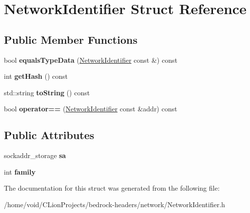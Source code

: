 \hypertarget{struct_network_identifier}{}\section{Network\+Identifier Struct Reference}
\label{struct_network_identifier}
\subsection*{Public Member Functions}
\begin{DoxyCompactItemize}
\item 
\mbox{\label{struct_network_identifier_a64e2ed23f69e08ecfeedb79d16879f16}} 
bool {\bfseries equals\+Type\+Data} (\mbox{\hyperlink{struct_network_identifier}{Network\+Identifier}} const \&) const
\item 
\mbox{\label{struct_network_identifier_a6f70af24d1ac5b1b70d19d95b85643b2}} 
int {\bfseries get\+Hash} () const
\item 
\mbox{\label{struct_network_identifier_affd13c90fab6334bc7b6d46d0ee88490}} 
std\+::string {\bfseries to\+String} () const
\item 
\mbox{\label{struct_network_identifier_a58e6203460b78d32a82b6b49ab0c15e1}} 
bool {\bfseries operator==} (\mbox{\hyperlink{struct_network_identifier}{Network\+Identifier}} const \&addr) const
\end{DoxyCompactItemize}
\subsection*{Public Attributes}
\begin{DoxyCompactItemize}
\item 
\mbox{\label{struct_network_identifier_ab4c3a6185b2bd27696cd5a0fd78aa7d1}} 
sockaddr\+\_\+storage {\bfseries sa}
\item 
\mbox{\label{struct_network_identifier_aa1176d043b76b895fc80b5d3822b20cc}} 
int {\bfseries family}
\end{DoxyCompactItemize}


The documentation for this struct was generated from the following file\+:\begin{DoxyCompactItemize}
\item 
/home/void/\+C\+Lion\+Projects/bedrock-\/headers/network/Network\+Identifier.\+h\end{DoxyCompactItemize}
